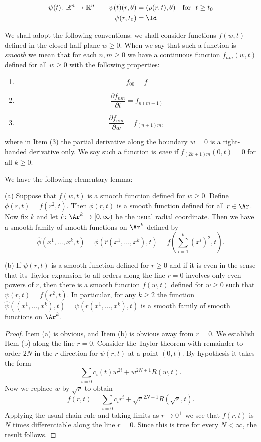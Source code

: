 \begin{align}\label{ansatz}
\psi(t)\colon \mathbb{R}^n \rightarrow  \mathbb{R}^n \qquad
\psi(t)(r,\theta) & =(\rho(r,t),\theta) \ \ \ \text{for}\ \ t\ge t_0 \\
\psi(r,t_0) & = \Id \nonumber
\end{align}

We shall adopt the following conventions: we shall consider
functions $f(w,t)$ defined in the closed half-plane $w\ge 0$. When
we say that such a function is {\em smooth} we mean that for each
$n,m\ge 0$ we have a continuous function $f_{nm}(w,t)$ defined for
all $w\ge 0$ with the following properties:
\begin{enumerate}
\item[(1)] $$f_{00}=f$$
\item[(2)] $$\frac{\partial f_{nm}}{\partial t}=f_{n(m+1)}$$
\item[(3)] $$\frac{\partial f_{nm}}{\partial w}=f_{(n+1)m},$$
\end{enumerate}
where in Item (3) the partial derivative along the boundary $w=0$ is
a right-handed derivative only. We say such a function is {\em even}
if $f_{(2k+1)m}(0,t)=0$ for all $k\ge 0$.

We have the following elementary lemma:

\begin{lemma}
\label{lem:even-odd-radial-functions}
(a) Suppose that $f(w,t)$ is a smooth function defined for $w\ge 0$.
Define $\phi(r,t)=f(r^2,t)$. Then $\phi(r,t)$ is a smooth function
defined for all $r\in \Ar$. Now fix $k$ and let $\hat r\colon
\Ar^k\to [0,\infty)$ be the usual radial coordinate.  Then we have a
smooth family of smooth functions on $\Ar^k$ defined by
$$\hat\phi(x^1,\ldots,x^k,t)=\phi(\hat r(x^1,\ldots,x^k),t)=f(\sum_{i=1}^k(x^i)^2,t).$$

\noindent (b) If $\psi(r,t)$ is a smooth function defined for $r\ge
0$ and if it is even in the sense that its Taylor expansion to all
orders along the line $r=0$ involves only even powers of $r$, then
there is a smooth function $f(w,t)$ defined for $w\ge 0$ such that
$\psi(r,t)=f(r^2,t)$. In particular, for any $k\ge 2$ the function
$\hat\psi((x^1,\ldots,x^k),t)=\psi(r(x^1,\ldots,x^k),t)$ is a smooth
family of smooth functions on $\Ar^k$.
\end{lemma}

\begin{proof}
Item (a) is obvious, and Item (b) is obvious away from $r=0$. We
establish Item (b) along the line $r=0$. Consider the Taylor theorem
with remainder to order $2N$ in the $r$-direction for $\psi(r,t)$ at
a point $(0,t)$. By hypothesis it takes the form
$$\sum_{i=0}c_i(t)w^{2i}+w^{2N+1}R(w,t).$$
Now we replace $w$ by $\sqrt{r}$ to obtain
$$f(r,t)=\sum_{i=0}c_ir^i+\sqrt{r}^{2N+1}R(\sqrt{r},t).$$
Applying the usual chain rule and taking limits as $r\rightarrow
0^+$ we see that $f(r,t)$ is $N$ times differentiable along the line
$r=0$. Since this is true for every $N<\infty$, the result follows.
\end{proof}


